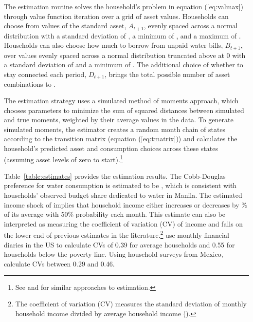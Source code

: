 \documentclass[12pt]{article}
\begin{document}
The estimation routine solves the household's problem in equation (\ref{eq:valmax}) through value function iteration over a grid of asset values.  Households can choose from values of the standard asset, $A_{t+1}$, evenly spaced across a normal distribution with a standard deviation of \unskip, a minimum of \unskip, and a maximum of \unskip.  Households can also choose how much to borrow from unpaid water bills, $B_{t+1}$, over values evenly spaced across a normal distribution truncated above at 0 with a standard deviation of and a minimum of \unskip.  The additional choice of whether to stay connected each period, $D_{t+1}$, brings the total possible number of asset combinations to \unskip.  

The estimation strategy uses a simulated method of moments approach, which chooses parameters to minimize the sum of squared distances between simulated and true moments, weighted by their average values in the data.  To generate simulated moments, the estimator creates a random month chain of states according to the transition matrix (equation (\ref{eq:tmatrix})) and calculates the household's predicted asset and consumption choices across these states (assuming asset levels of zero to start).\footnote{See \cite{laibson2007estimating} and \cite{gourinchas2002consumption} for similar approaches to estimation.}

Table~\ref{table:estimates} provides the estimation results.  The Cobb-Douglas preference for water consumption is estimated to be \unskip, which is consistent with households' observed budget share dedicated to water in Manila.  The estimated income shock of implies that household income either increases or decreases by \unskip\% of its average with 50\% probability each month.  This estimate can also be interpreted as measuring the coefficient of variation (CV) of income and falls on the lower end of previous estimates in the literature.\footnote{The coefficient of variation (CV) measures the standard deviation of monthly household income divided by average household income (\cite{hannagan2015income}).}  \cite{hannagan2015income} use monthly financial diaries in the US to calculate CVs of 0.39 for average households and 0.55 for households below the poverty line.  Using household surveys from Mexico, \cite{amuedo2011remittances} calculate CVs between 0.29 and 0.46. %
\end{document}
